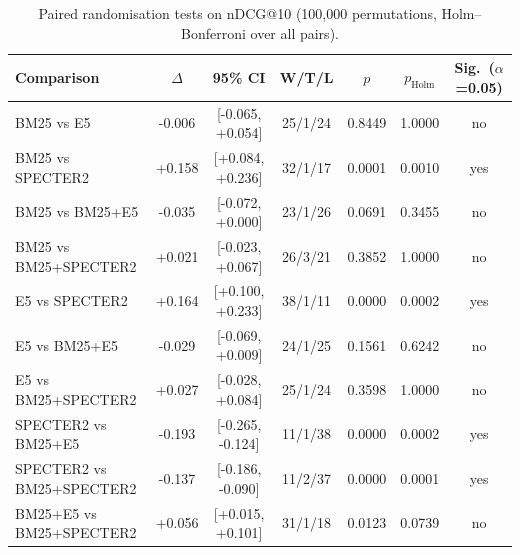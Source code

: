 \begin{table}[t]
\centering
\small
\caption{Paired randomisation tests on nDCG@10 (100,000 permutations, Holm--Bonferroni over all pairs).}
\label{tab:sig}
\begin{tabular}{lcccccc}
\toprule
Comparison & $\Delta$ & 95\% CI & W/T/L & $p$ & $p_{\text{Holm}}$ & Sig.\ ($\alpha$=0.05) \\
\midrule
BM25 vs E5 & -0.006 & [-0.065, +0.054] & 25/1/24 & 0.8449 & 1.0000 & no \\
BM25 vs SPECTER2 & +0.158 & [+0.084, +0.236] & 32/1/17 & 0.0001 & 0.0010 & yes \\
BM25 vs BM25+E5 & -0.035 & [-0.072, +0.000] & 23/1/26 & 0.0691 & 0.3455 & no \\
BM25 vs BM25+SPECTER2 & +0.021 & [-0.023, +0.067] & 26/3/21 & 0.3852 & 1.0000 & no \\
E5 vs SPECTER2 & +0.164 & [+0.100, +0.233] & 38/1/11 & 0.0000 & 0.0002 & yes \\
E5 vs BM25+E5 & -0.029 & [-0.069, +0.009] & 24/1/25 & 0.1561 & 0.6242 & no \\
E5 vs BM25+SPECTER2 & +0.027 & [-0.028, +0.084] & 25/1/24 & 0.3598 & 1.0000 & no \\
SPECTER2 vs BM25+E5 & -0.193 & [-0.265, -0.124] & 11/1/38 & 0.0000 & 0.0002 & yes \\
SPECTER2 vs BM25+SPECTER2 & -0.137 & [-0.186, -0.090] & 11/2/37 & 0.0000 & 0.0001 & yes \\
BM25+E5 vs BM25+SPECTER2 & +0.056 & [+0.015, +0.101] & 31/1/18 & 0.0123 & 0.0739 & no \\
\bottomrule
\end{tabular}
\end{table}
